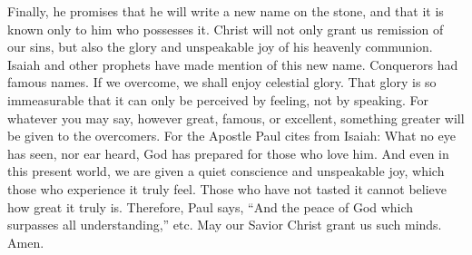 Finally, he promises that he will write a new name on the stone, and that it is known only to him who possesses it. Christ will not only grant us remission of our sins, but also the glory and unspeakable joy of his heavenly communion. Isaiah and other prophets have made mention of this new name. Conquerors had famous names. If we overcome, we shall enjoy celestial glory. That glory is so immeasurable that it can only be perceived by feeling, not by speaking. For whatever you may say, however great, famous, or excellent, something greater will be given to the overcomers. For the Apostle Paul cites from Isaiah: What no eye has seen, nor ear heard, God has prepared for those who love him. And even in this present world, we are given a quiet conscience and unspeakable joy, which those who experience it truly feel. Those who have not tasted it cannot believe how great it truly is. Therefore, Paul says, “And the peace of God which surpasses all understanding,” etc. May our Savior Christ grant us such minds. Amen.
